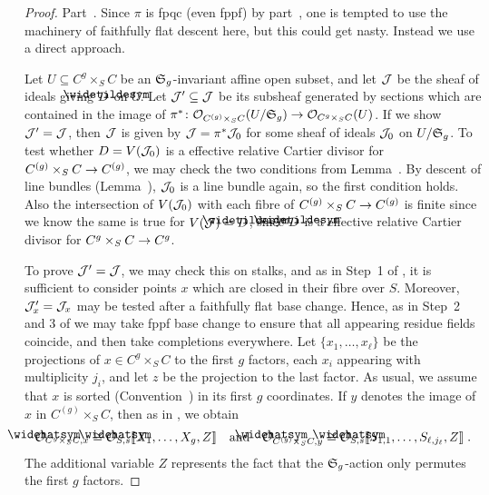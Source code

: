 \documentclass[a4paper,parskip=half,numbers=enddot, DIV=12]{scrreprt}
\begin{document}
\begin{proof}
	Part~. Since $\pi$ is fpqc (even fppf) by part~, one is tempted to use the machinery of faithfully flat descent here, but this could get nasty. Instead we use a direct approach.
	
	 Let $U\subseteq C^g\times_SC$ be an $\mathfrak{S}_g$-invariant affine open subset, and let $\mathcal{J}$ be the sheaf of ideals giving $\snake{D}$ on  $U$. Let $\mathcal{J}'\subseteq \mathcal{J}$ be its subsheaf generated by sections which are contained in the image of $\pi^*\colon \Oo_{C^{(g)}\times_SC}(U/\SS_g)\morphism\Oo_{C^g\times_SC}(U)$. If we show $\mathcal{J}'=\mathcal{J}$, then $\mathcal{J}$ is given by $\mathcal{J}=\pi^*\mathcal{J}_0$ for some sheaf of ideals $\mathcal{J}_0$ on $U/\mathfrak{S}_g$. To test whether $D=V(\mathcal{J}_0)$ is a  effective relative Cartier divisor for $C^{(g)}\times_SC\morphism C^{(g)}$, we may check the two conditions from Lemma~. By descent of line bundles (Lemma~), $\mathcal{J}_0$ is a line bundle again, so the first condition holds. Also the intersection of $V(\mathcal{J}_0)$ with each fibre of $C^{(g)}\times_SC\morphism C^{(g)}$ is finite since we know the same is true for $V(\Jj)=\snake{D}$, since $\snake{D}$ is a  effective relative Cartier divisor for $C^g\times_SC\morphism C^g$.
	 
	 To prove $\mathcal{J}'=\mathcal{J}$, we may check this on stalks, and as in Step~1 of , it is sufficient to consider points $x$ which are closed in their fibre over $S$. Moreover, $\mathcal{J}'_x=\mathcal{J}_x$ may be tested after a faithfully flat base change. Hence, as in Step~2 and 3 of  we may take fppf base change to ensure that all appearing residue fields coincide, and then take completions everywhere. Let $\{x_1,\ldots,x_\ell\}$ be the projections of $x\in C^g\times_S C$ to the first $g$ factors, each $x_i$ appearing with multiplicity $j_i$, and let $z$ be the projection to the last factor. As usual, we assume that $x$ is sorted (Convention~) in its first $g$ coordinates. If $y$ denotes the image of $x$ in $C^{(g)}\times_SC$, then as in , we obtain
	 \begin{align}\lbl{eq:OCgx4}
	 	\roof{\Oo}_{C^g\times_SC,x}\cong \roof{\Oo}_{S,s}\llbracket X_1,\ldots,X_g,Z\rrbracket\quad\text{and}\quad\roof{\Oo}_{C^{(g)}\times_SC,y}\cong \roof{\Oo}_{S,s}\llbracket S_{1,1},\ldots,S_{\ell,j_\ell},Z\rrbracket\;.
	 \end{align}
	 The additional variable $Z$ represents the fact that the $\mathfrak{S}_g$-action only permutes the first $g$ factors.
	 

\end{proof}
\end{document}
